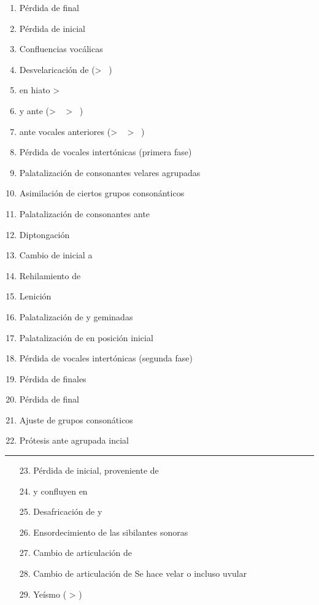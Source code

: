 \documentclass[12pt]{article}
\begin{document}
{\large{
\begin{enumerate}
\itemsep=.5mm
	\item Pérdida de \textipa{[m]} final
	\item Pérdida de \textipa{[h]} inicial
	\item Confluencias vocálicas
	\item Desvelaricación de \textipa{[w]} (> \ \textipa{[B]})
	\item {\textipa{[e]}} en hiato > \ \textipa{[j]}
	\item {\textipa{[t]}} y \textipa{[k]} ante \textipa{[j]} (> \ \textipa{[\textteshlig]} > \ \textipa{[ts]})
	\item {\textipa{[k]}} ante vocales anteriores (> \ \textipa{[\textteshlig]} > \ \textipa{[ts]})
	\item Pérdida de vocales intertónicas (primera fase)
	\item Palatalización de consonantes velares agrupadas
	\item Asimilación de ciertos grupos consonánticos
	\item Palatalización de consonantes ante \textipa{[j]}
	\item Diptongación
	\item Cambio de \textipa{[f]} inicial a \textipa{[h]}
	\item Rehilamiento de 
	\item Lenición
	\item Palatalización de \textipa{[l]} y \textipa{[n]} geminadas
	\item Palatalización de \textipa{[kl], [pl], [fl]} en posición inicial
	\item Pérdida de vocales intertónicas (segunda fase)
	\item Pérdida de \textipa{[t], [d], [k]} finales
	\item Pérdida de \textipa{[e]} final
	\item Ajuste de grupos consonáticos
	\item Prótesis ante \textipa{[s]} agrupada incial
\end{enumerate}

\hrule

\begin{enumerate}
	\item[23.] Pérdida de \textipa{[h]} inicial, proveniente de \textipa{[f]}
	\item[24.]  y \textipa{/\textbeta/} confluyen en   
	\item[25.] Desafricación de \textipa{[ts]} y \textipa{[dz]}  
	\item[26.] Ensordecimiento de las sibilantes sonoras  
	\item[27.] Cambio de articulación de \textipa{[\c{s}]}  
	\item[28.] Cambio de articulación de \textipa{[\textesh]} Se hace velar o incluso uvular  
	\item[29.] Yeísmo (\textipa{/\textturny/} > \textipa{/\textctj/})
\end{enumerate}
}}
\end{document}

